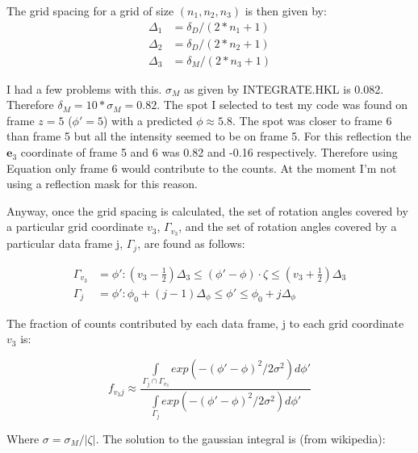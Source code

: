 \documentclass[a4paper,10pt]{article}
\begin{document}
The grid spacing for a grid of size $(n_1, n_2, n_3)$ is then given by:
\begin{equation}
  \begin{aligned}
    \Delta_1 &= \delta_D / (2 * n_1 + 1) \\
    \Delta_2 &= \delta_D / (2 * n_2 + 1) \\
    \Delta_3 &= \delta_M / (2 * n_3 + 1)
  \end{aligned}
\end{equation}

I had a few problems with this. $\sigma_M$ as given by INTEGRATE.HKL is
0.082. Therefore $\delta_M = 10 * \sigma_M = 0.82$. The spot I selected to test
my code was found on frame $z = 5$ ($\phi' = 5$) with a predicted 
$\phi \approx 5.8$. The spot was closer to frame 6 than frame 5 but all the 
intensity seemed to be on frame 5. For this reflection the $\bm{e}_3$ coordinate 
of frame 5 and 6 was 0.82 and -0.16 respectively. Therefore using Equation 
 only frame 6 would contribute to the counts.
At the moment I'm not using a reflection mask for this reason. 

Anyway, once the grid spacing is calculated, the set of rotation angles 
covered by a particular grid coordinate $v_3$, $\Gamma_{v_3}$, and the set of 
rotation angles covered by a particular data frame j, $\Gamma_j$, are found 
as follows:

\begin{equation}
  \begin{aligned}
    \Gamma_{v_3} &= { \phi' : (v_3 - \frac{1}{2}) \Delta_3 
                    \le (\phi' - \phi) \cdot \zeta 
                    \le (v_3 + \frac{1}{2}) \Delta_3} \\
    \Gamma_j     &= { \phi' : \phi_0 + (j - 1) \Delta_\phi 
                    \le \phi' 
                    \le \phi_0 + j \Delta_\phi }
  \end{aligned}
\end{equation}

The fraction of counts contributed by each data frame, j to each grid coordinate
$v_3$ is:

\begin{equation}
  f_{{v_3}j} \approx \frac{
    \int\limits_{\Gamma_j \cap \Gamma_{v_3}} 
      exp(-(\phi' - \phi)^2 / 2 \sigma^2) d \phi'
  }{
    \int\limits_{\Gamma_j}
    exp(-(\phi' - \phi)^2 / 2 \sigma^2) d \phi'
  }
\end{equation}

Where $\sigma = \sigma_M / |\zeta|$. The solution to the gaussian integral is 
(from wikipedia):
\end{document}
